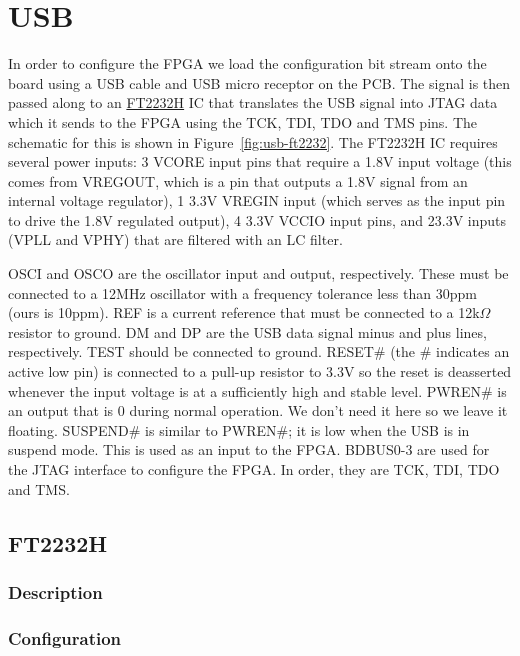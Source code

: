 \section{USB}

In order to configure the FPGA we load the configuration bit stream onto the board using a USB cable
and USB micro receptor on the PCB. The signal is then passed along to an
\href{http://www.ftdichip.com/Support/Documents/DataSheets/ICs/DS_FT2232H.pdf}{FT2232H} IC that
translates the USB signal into JTAG data which it sends to the FPGA using the TCK, TDI, TDO and TMS
pins. The schematic for this is shown in Figure~\ref{fig:usb-ft2232}. The FT2232H IC requires
several power inputs: 3 VCORE input pins that require a 1.8V input voltage (this comes from VREGOUT,
which is a pin that outputs a 1.8V signal from an internal voltage regulator), 1 3.3V VREGIN input
(which serves as the input pin to drive the 1.8V regulated output), 4 3.3V VCCIO input pins, and
23.3V inputs (VPLL and VPHY) that are filtered with an LC filter.

OSCI and OSCO are the oscillator input and output, respectively. These must be connected to a 12MHz
oscillator with a frequency tolerance less than 30ppm (ours is 10ppm). REF is a current reference
that must be connected to a 12k$\Omega$ resistor to ground. DM and DP are the USB data signal minus
and plus lines, respectively. TEST should be connected to ground. RESET\# (the \# indicates an
active low pin) is connected to a pull-up resistor to 3.3V so the reset is deasserted whenever the
input voltage is at a sufficiently high and stable level. PWREN\# is an output that is 0 during
normal operation. We don't need it here so we leave it floating. SUSPEND\# is similar to PWREN\#; it
is low when the USB is in suspend mode. This is used as an input to the FPGA. BDBUS0-3 are used for
the JTAG interface to configure the FPGA. In order, they are TCK, TDI, TDO and TMS.

\subsection{FT2232H}
\label{sec:ft2232h}

\subsubsection{Description}
\label{sec:ft2232h-description}



\subsubsection{Configuration}
\label{sec:ft2232h-configuration}

